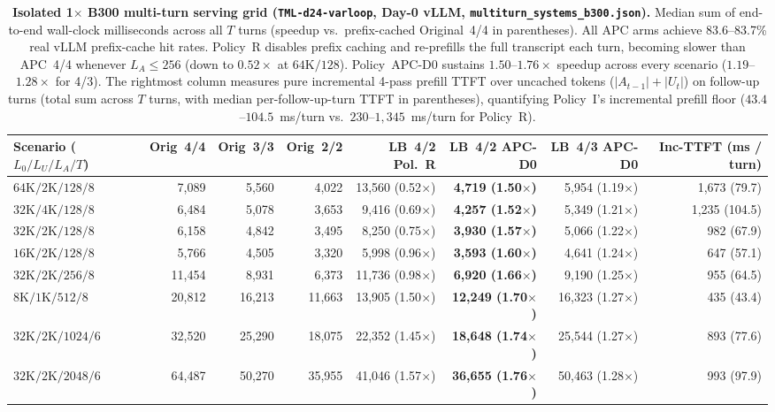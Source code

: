 \documentclass[11pt]{article}
\begin{document}
\begin{table}[t]
\centering\scriptsize
\setlength\tabcolsep{3.2pt}
\begin{tabular}{@{}l r r r r r r r@{}}
\toprule
Scenario ($L_0 / L_U / L_A / T$) & Orig~4/4 & Orig~3/3 & Orig~2/2 & LB~4/2 Pol.~R & \textbf{LB~4/2 APC-D0} & \textbf{LB~4/3 APC-D0} & Inc-TTFT (ms / turn) \\
\midrule
$64\text{K} / 2\text{K} / 128 / 8$ & 7,089 & 5,560 & 4,022 & 13,560 (0.52$\times$) & \textbf{4,719 (1.50$\times$)} & 5,954 (1.19$\times$) & 1,673 (79.7) \\
$32\text{K} / 4\text{K} / 128 / 8$ & 6,484 & 5,078 & 3,653 & 9,416 (0.69$\times$) & \textbf{4,257 (1.52$\times$)} & 5,349 (1.21$\times$) & 1,235 (104.5) \\
$32\text{K} / 2\text{K} / 128 / 8$ & 6,158 & 4,842 & 3,495 & 8,250 (0.75$\times$) & \textbf{3,930 (1.57$\times$)} & 5,066 (1.22$\times$) & 982 (67.9) \\
$16\text{K} / 2\text{K} / 128 / 8$ & 5,766 & 4,505 & 3,320 & 5,998 (0.96$\times$) & \textbf{3,593 (1.60$\times$)} & 4,641 (1.24$\times$) & 647 (57.1) \\
$32\text{K} / 2\text{K} / 256 / 8$ & 11,454 & 8,931 & 6,373 & 11,736 (0.98$\times$) & \textbf{6,920 (1.66$\times$)} & 9,190 (1.25$\times$) & 955 (64.5) \\
$8\text{K} / 1\text{K} / 512 / 8$ & 20,812 & 16,213 & 11,663 & 13,905 (1.50$\times$) & \textbf{12,249 (1.70$\times$)} & 16,323 (1.27$\times$) & 435 (43.4) \\
$32\text{K} / 2\text{K} / 1024 / 6$ & 32,520 & 25,290 & 18,075 & 22,352 (1.45$\times$) & \textbf{18,648 (1.74$\times$)} & 25,544 (1.27$\times$) & 893 (77.6) \\
$32\text{K} / 2\text{K} / 2048 / 6$ & 64,487 & 50,270 & 35,955 & 41,046 (1.57$\times$) & \textbf{36,655 (1.76$\times$)} & 50,463 (1.28$\times$) & 993 (97.9) \\
\bottomrule
\end{tabular}
\caption{\textbf{Isolated 1$\times$ B300 multi-turn serving grid (\texttt{TML-d24-varloop}, Day-0 vLLM, \texttt{multiturn\_systems\_b300.json}).}
Median sum of end-to-end wall-clock milliseconds across all $T$ turns (speedup vs.\ prefix-cached Original~4/4 in
parentheses). All APC arms achieve 83.6--83.7\% real vLLM prefix-cache hit rates. Policy~R disables prefix caching and
re-prefills the full transcript each turn, becoming slower than APC~4/4 whenever $L_A{\le}256$ (down to $0.52\times$ at
$64\text{K}/128$). Policy~APC-D0 sustains $1.50$--$1.76\times$ speedup across every scenario ($1.19$--$1.28\times$ for
4/3). The rightmost column measures pure incremental 4-pass prefill TTFT over uncached tokens ($|A_{t-1}|{+}|U_t|$) on
follow-up turns (total sum across $T$ turns, with median per-follow-up-turn TTFT in parentheses), quantifying Policy~I's
incremental prefill floor ($43.4$--$104.5$~ms/turn vs.\ $230$--$1{,}345$~ms/turn for Policy~R).}
\label{tab:mt_systems}
\end{table}
\end{document}
